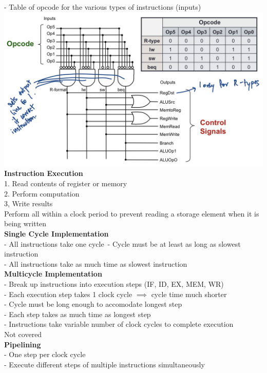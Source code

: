 \documentclass[10pt, a4paper]{article}
\begin{document}
\begin{multicols*}{3}
		- Table of opcode for the various types of instructions (inputs)\\
		\includegraphics[scale=0.16]{./assets/controlCircuit}\\	
		
		\textbf{Instruction Execution}\\
		1. Read contents of register or memory\\
		2. Perform computation\\
		3, Write results\\
		Perform all within a clock period to prevent reading a storage element when it is being written\\
		
		\textbf{Single Cycle Implementation}\\
		- All instructions take one cycle\
		- Cycle must be at least as long as slowest instruction\\
		- All instructions take as much time as slowest instruction\\
		
		\textbf{Multicycle Implementation}\\
		- Break up instructions into execution steps (IF, ID, EX, MEM, WR)\\
		- Each execution step takes 1 clock cycle $\implies$ cycle time much shorter\\	
		- Cycle must be long enough to accomodate longest step\\
		- Each step takes as much time as longest step\\
		- Instructions take variable number of clock cycles to complete execution\\
		Not covered\\
		
		\textbf{Pipelining}\\
		- One step per clock cycle\\
		- Execute different steps of multiple instructions simultaneously\\
		

\end{multicols*}
\end{document}
